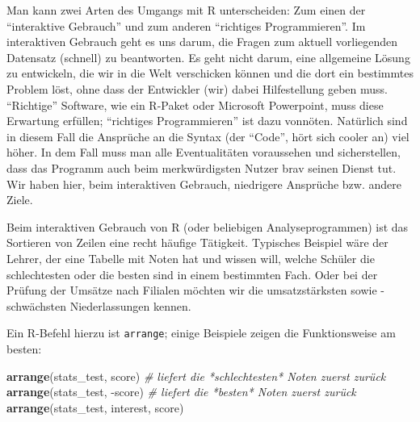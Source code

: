 \documentclass[12pt,ngerman,]{book}
\newenvironment{Shaded}{\begin{snugshade}}{\end{snugshade}}
\newcommand{\KeywordTok}[1]{\textcolor[rgb]{0.13,0.29,0.53}{\textbf{{#1}}}}
\newcommand{\CommentTok}[1]{\textcolor[rgb]{0.56,0.35,0.01}{\textit{{#1}}}}
\newcommand{\NormalTok}[1]{{#1}}
\renewenvironment{Shaded}{\begin{kframe}}{\end{kframe}}
\begin{document}
Man kann zwei Arten des Umgangs mit R unterscheiden: Zum einen der
``interaktive Gebrauch'' und zum anderen ``richtiges Programmieren''. Im
interaktiven Gebrauch geht es uns darum, die Fragen zum aktuell
vorliegenden Datensatz (schnell) zu beantworten. Es geht nicht darum,
eine allgemeine Lösung zu entwickeln, die wir in die Welt verschicken
können und die dort ein bestimmtes Problem löst, ohne dass der
Entwickler (wir) dabei Hilfestellung geben muss. ``Richtige'' Software,
wie ein R-Paket oder Microsoft Powerpoint, muss diese Erwartung
erfüllen; ``richtiges Programmieren'' ist dazu vonnöten. Natürlich sind
in diesem Fall die Ansprüche an die Syntax (der ``Code'', hört sich
cooler an) viel höher. In dem Fall muss man alle Eventualitäten
voraussehen und sicherstellen, dass das Programm auch beim
merkwürdigsten Nutzer brav seinen Dienst tut. Wir haben hier, beim
interaktiven Gebrauch, niedrigere Ansprüche bzw. andere Ziele.

Beim interaktiven Gebrauch von R (oder beliebigen Analyseprogrammen) ist
das Sortieren von Zeilen eine recht häufige Tätigkeit. Typisches
Beispiel wäre der Lehrer, der eine Tabelle mit Noten hat und wissen
will, welche Schüler die schlechtesten oder die besten sind in einem
bestimmten Fach. Oder bei der Prüfung der Umsätze nach Filialen möchten
wir die umsatzstärksten sowie -schwächsten Niederlassungen kennen.

Ein R-Befehl hierzu ist \texttt{arrange}; einige
Beispiele zeigen die Funktionsweise am besten:

\begin{Shaded}
\begin{Highlighting}[]

\KeywordTok{arrange}\NormalTok{(stats_test, score) }\CommentTok{# liefert die *schlechtesten* Noten zuerst zurück}
\KeywordTok{arrange}\NormalTok{(stats_test, -score) }\CommentTok{# liefert die *besten* Noten zuerst zurück}
\KeywordTok{arrange}\NormalTok{(stats_test, interest, score)}
\end{Highlighting}
\end{Shaded}
\end{document}
